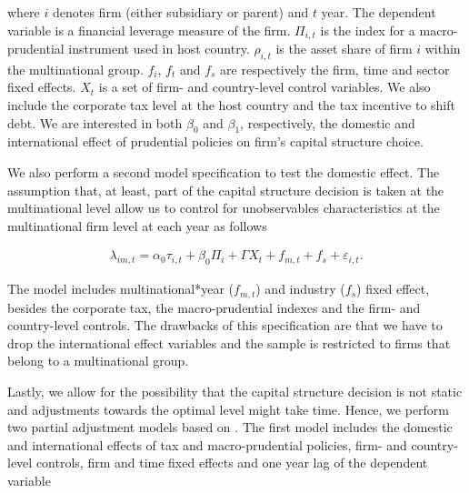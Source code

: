 \documentclass[12pt]{article}
\begin{document}
	where $i$ denotes firm (either subsidiary or parent) and $t$ year. The dependent variable is a financial leverage measure of the firm. $\Pi_{i,t}$ is the index for a macro-prudential instrument used in host country. $\rho_{i,t}$ is the asset share of firm $i$ within the multinational group. $f_{i}$, $f_{t}$ and $f_{s}$ are respectively the firm, time and sector fixed effects. $X_t$ is a set of firm- and country-level control variables. We also include the corporate tax level at the host country and the tax incentive to shift debt. We are interested in both $\beta_0$ and $\beta_1$, respectively, the domestic and international effect of prudential policies on firm's capital structure choice.
	
	We also perform a second model specification to test the domestic effect. The assumption that, at least, part of the capital structure decision is taken at the multinational level allow us to control for unobservables characteristics at the multinational firm level at each year as follows   
	
	\begin{equation}
	\begin{aligned}
	\lambda_{im,t}=\alpha_0\tau_{i,t}+\beta_0\Pi_i
	+\Gamma X_{t}+f_{m,t}+f_{s}+\varepsilon_{i,t}.
	\label{eq:9}
	\end{aligned}
	\end{equation}
	
	The model includes multinational*year ($f_{m,t}$) and industry ($f_{s}$) fixed effect, besides the corporate tax, the macro-prudential indexes and the firm- and country-level controls. The drawbacks of this specification are that we have to drop the international effect variables and the sample is restricted to firms that belong to a multinational group. 
	
	Lastly, we allow for the possibility that the capital structure decision is not static and adjustments towards the optimal level might take time. Hence,  we perform two partial adjustment models based on \cite*{flannery2006partial}. The first model includes the domestic and international effects of tax and macro-prudential policies, firm- and country-level controls, firm and time fixed effects and one year lag of the dependent variable
	
\end{document}

